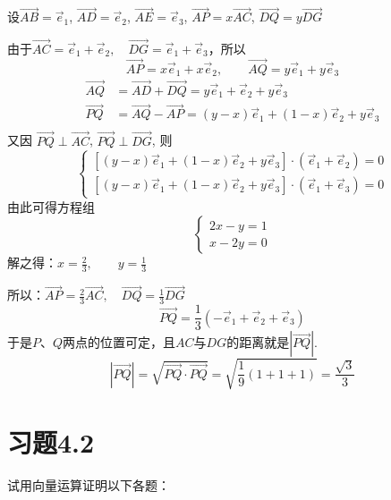 \begin{solution}
设$\Vec{AB}=\vec{e}_1$, $\Vec{AD}=\vec{e}_2$, $\Vec{AE}=\vec{e}_3$, $\Vec{AP}=x\Vec{AC}$, $\Vec{DQ}=y\Vec{DG}$ 

由于$\Vec{AC}=\vec{e}_1+\vec{e}_2,\quad \Vec{DG}=\vec{e}_1+\vec{e}_3$，所以
\[\Vec{AP}=x\vec{e}_1+x\vec{e}_2,\qquad \Vec{AQ}=y\vec{e}_1+y\vec{e}_3\]
\[\begin{split}
    \Vec{AQ}&=\Vec{AD}+\Vec{DQ}=y\vec{e}_1+\vec{e}_2+y\vec{e}_3\\
    \Vec{PQ}&=\Vec{AQ}-\Vec{AP}=(y-x)\vec{e}_1+(1-x)\vec{e}_2+y\vec{e}_3\\
\end{split}\]
又因 $\Vec{P Q} \perp \Vec{A C}$, $\Vec{P Q} \perp \Vec{D G}$, 则
\[\begin{cases}
    {\left[(y-x) \vec{e}_{1}+(1-x) \vec{e}_{2}+y \vec{e}_{3}\right] \cdot\left(\vec{e}_{1}+\vec{e}_{2}\right)=0} \\
    {\left[(y-x) \vec{e}_{1}+(1-x) \vec{e}_{2}+y \vec{e}_{3}\right] \cdot\left(\vec{e}_{1}+\vec{e}_{3}\right)=0}
\end{cases}\]
由此可得方程组
\[\begin{cases}
    2 x-y=1 \\
x-2 y=0
\end{cases}\]
解之得：$x=\frac{2}{3}, \qquad y=\frac{1}{3}$

所以：$\Vec{AP}=\frac{2}{3}\Vec{AC},\quad \Vec{DQ}=\frac{1}{3}\Vec{DG}$
\[\Vec{PQ}=\frac{1}{3}\left(-\vec{e}_1+\vec{e}_2+\vec{e}_3\right)\]
于是$P$、$Q$两点的位置可定，且$AC$与$DG$的距离就是$|\Vec{PQ}|$. 
\[|\Vec{PQ}|=\sqrt{\Vec{PQ}\cdot \Vec{PQ}}=\sqrt{\frac{1}{9}(1+1+1)}=\frac{\sqrt{3}}{3}\]
\end{solution}


\section*{习题4.2}

试用向量运算证明以下各题：

